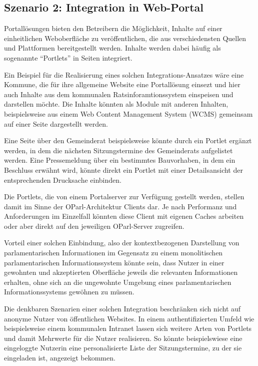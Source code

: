 \documentclass[,a4paper]{article}
\begin{document}
\subsection{Szenario 2: Integration in
Web-Portal}\label{szenarioux5fwebux5fportal}

Portallösungen bieten den Betreibern die Möglichkeit, Inhalte auf einer
einheitlichen Weboberfläche zu veröffentlichen, die aus verschiedensten
Quellen und Plattformen bereitgestellt werden. Inhalte werden dabei
häufig als sogenannte ``Portlets'' in Seiten integriert.

Ein Beispiel für die Realisierung eines solchen Integrations-Ansatzes
wäre eine Kommune, die für ihre allgemeine Website eine Portallösung
einsezt und hier auch Inhalte aus dem kommunalen Ratsinforamtionssystem
einspeisen und darstellen möchte. Die Inhalte könnten als Module mit
anderen Inhalten, beispielsweise aus einem Web Content Management System
(WCMS) gemeinsam auf einer Seite dargestellt werden.

Eine Seite über den Gemeinderat beispielsweise könnte durch ein Portlet
ergänzt werden, in dem die nächsten Sitzungstermine des Gemeinderats
aufgelistet werden. Eine Pressemeldung über ein bestimmtes Bauvorhaben,
in dem ein Beschluss erwähnt wird, könnte direkt ein Portlet mit einer
Detailsansicht der entsprechenden Drucksache einbinden.

Die Portlets, die von einem Portalserver zur Verfügung gestellt werden,
stellen damit im Sinne der OParl-Architektur Clients dar. Je nach
Performanz und Anforderungen im Einzelfall könnten diese Client mit
eigenen Caches arbeiten oder aber direkt auf den jeweiligen OParl-Server
zugreifen.

Vorteil einer solchen Einbindung, also der kontextbezogenen Darstellung
von parlamentarischen Informationen im Gegensatz zu einem monolitischen
parlamentarischen Informationssystem könnte sein, dass Nutzer in einer
gewohnten und akzeptierten Oberfläche jeweils die relevanten
Informationen erhalten, ohne sich an die ungewohnte Umgebung eines
parlamentarischen Informationssystems gewöhnen zu müssen.

Die denkbaren Szenarien einer solchen Integration beschränken sich nicht
auf anonyme Nutzer von öffentlichen Websites. In einem authentifizierten
Umfeld wie beispielsweise einem kommunalen Intranet lassen sich weitere
Arten von Portlets und damit Mehrwerte für die Nutzer realisieren. So
könnte beispielswiese eine eingeloggte Nutzerin eine personalisierte
Liste der Sitzungstermine, zu der sie eingeladen ist, angezeigt
bekommen.
\end{document}

